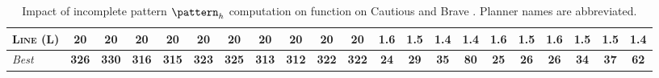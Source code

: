 \documentclass[11pt,landscape]{article}
\begin{document}
\begin{table}[tb]
{\begin{tabular}{|l||cccccccccc||cccccccccc||}
\textsc{Line} (L)&\textbf{20}&\textbf{20}&\textbf{20}&\textbf{20}&\textbf{20}&\textbf{20}&\textbf{20}&\textbf{20}&\textbf{20}&\textbf{20}&1.6&1.5&\textbf{1.4}&\textbf{1.4}&1.6&1.5&1.6&1.5&1.5&\textbf{1.4}
\\\hline
\textit{Best}&\textbf{326}&\textbf{330}&\textbf{316}&\textbf{315}&\textbf{323}&\textbf{325}&\textbf{313}&\textbf{312}&\textbf{322}&\textbf{322}&\textbf{24}&\textbf{29}&\textbf{35}&\textbf{80}&\textbf{25}&\textbf{26}&\textbf{26}&\textbf{34}&\textbf{37}&\textbf{62}\\\hline

        \end{tabular}}
        \caption{Impact of incomplete pattern $\pattern_h$ computation on function on Cautious and Brave \pattyd. Planner names are abbreviated.}
        \label{tab:abl-patternh-incomplete}
        \end{table}
        
\end{document}
